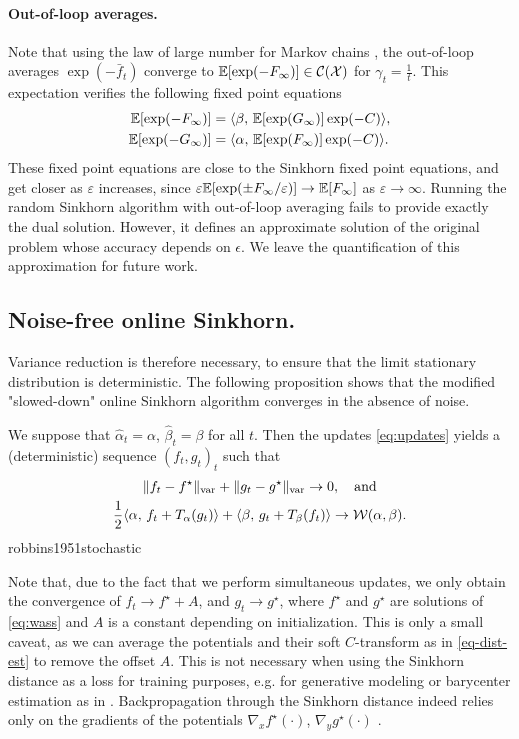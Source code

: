 \paragraph{Out-of-loop averages.} Note that using the law of large number for Markov chains
\citep{breiman_strong_1960}, the out-of-loop averages $\exp(-\bar f_t)$
converge to $\mathbb{E}[\exp(-F_\infty)] \in \mathcal{C}(\mathcal{X})$ for $\gamma_t = \frac{1}{t}$. This expectation verifies the following fixed point equations
\begin{align}
    \mathbb{E}[\exp(-F_\infty)] &=
     \langle \beta,\,\mathbb{E}[\exp(G_\infty)] \exp(-C)\rangle, \\
    \mathbb{E}[\exp(-G_\infty)] &=
     \langle \alpha,\,\mathbb{E}[\exp(F_\infty)] \exp(-C)\rangle.
\end{align}
These fixed point equations are close to the Sinkhorn fixed point equations, and
get closer as $\varepsilon$ increases, since $\varepsilon \mathbb{E}[\exp(\pm F_\infty /
\varepsilon)] \to \mathbb{E}[F_\infty]$ as $\varepsilon \to \infty$. Running the random
Sinkhorn algorithm with out-of-loop averaging fails to provide exactly the dual solution.
However, it defines an approximate solution of the original problem whose accuracy depends on $\epsilon$. 
%
We leave the quantification of this approximation for future work.

\subsection{Noise-free online Sinkhorn.}

Variance reduction is therefore necessary, to ensure that the limit stationary
distribution is deterministic. The following proposition shows that the modified "slowed-down" online Sinkhorn algorithm converges in the absence of noise.

\begin{proposition}\label{eq:deterministic}
    We suppose that $\hat \alpha_t = \alpha$, $\hat \beta_t = \beta$ for all
    $t$. Then the updates \eqref{eq:updates} yields a (deterministic) sequence $(f_t, g_t)_t$ such
    that 
    \begin{gather}
        \Vert f_t - f^\star \Vert_{\text{var}} 
        + \Vert g_t - g^\star \Vert_{\text{var}} \to 0,\quad\text{and} \\
        \frac{1}{2} \langle \alpha,\,f_t + T_{\alpha}(g_t)\rangle + \langle \beta,\,g_t + T_{\beta}(f_t)\rangle 
         \to \mathcal{W}(\alpha, \beta).
    \end{gather}robbins1951stochastic
\end{proposition}
Note that, due to the fact that we perform simultaneous updates, we only obtain
the convergence of $f_t \to f^\star + A$, and $g_t \to g^\star$, where $f^\star$
and $g^\star$ are solutions of \eqref{eq:wass} and $A$ is a constant depending
on initialization. This is only a small caveat, as we can average the potentials
and their soft $C$-transform as in \eqref{eq-dist-est} to remove the offset $A$.
This is not necessary when using the Sinkhorn distance as a loss for training
purposes, e.g. for generative modeling or barycenter estimation as in
\citet{staib2017parallel}. Backpropagation through the Sinkhorn distance indeed
relies only on the gradients of the potentials $\nabla_x f^\star(\cdot)$,
$\nabla_y g^\star(\cdot)$ \citep[e.g.][]{cuturi2018semidual}.
